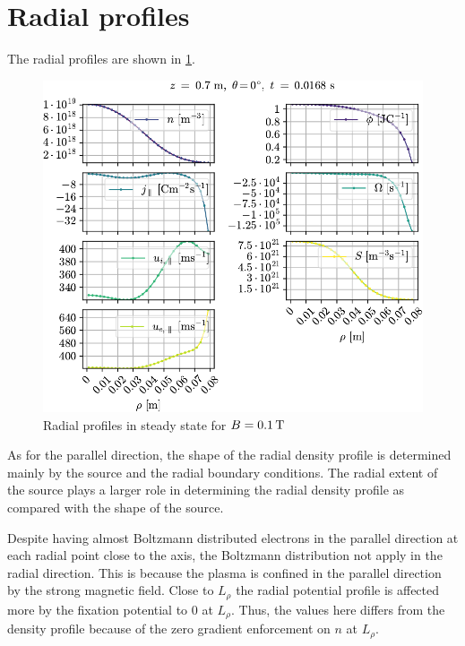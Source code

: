 \section{Radial profiles}
%
The radial profiles are shown in \cref{fig:radProfs}.
%
\begin{figure}[htb]
    \centering
    \includegraphics{fig/results/1DProfiles/B010Rad}
    \caption{Radial profiles in steady state for $B=0.1\, \text{T}$}
    \label{fig:radProfs}
\end{figure}
%
As for the parallel direction, the shape of the radial density profile is determined mainly by the source and the radial boundary conditions.
The radial extent of the source plays a larger role in determining the radial density profile as compared with the shape of the source.

Despite having almost Boltzmann distributed electrons in the parallel direction at each radial point close to the axis, the Boltzmann distribution not apply in the radial direction.
This is because the plasma is confined in the parallel direction by the strong magnetic field.
Close to $L_\rho$ the radial potential profile is affected more by the fixation potential to $0$ at $L_\rho$.
Thus, the values here differs from the density profile because of the zero gradient enforcement on $n$ at $L_\rho$.
